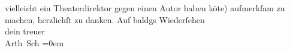 \begin{ledgroupsized}[t]{13cm}
               vielleicht ein Theaterdirektor gegen einen Autor haben kö{\geminationn}te) aufmerkſam zu machen, herzlichſt zu danken.{\pb}\pend
           \pstart
           {\pb}Auf baldgs
               Wiederſehen{\\[\baselineskip]}dein treuer{\\[\baselineskip]}\spacefill\mbox{Arth Sch}\pend
           \leftskip=0em{}\endnumbering{}\end{ledgroupsized}  \newcommand{\dateiname}{L01189}\newcommand{\titel}{Arthur Schnitzler an Hermann Bahr, 11. 12. 1901}\newcommand{\editorInnen}{ Kurt Ifkovits,  Martin Anton Müller}
      